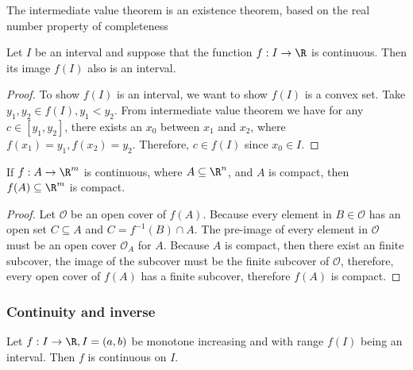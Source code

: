 \begin{refsection}
\begin{remark}[interpretation]
	The intermediate value theorem is an existence theorem, based on the real number property of completeness
\end{remark}

\begin{lemma}\label{ch:calculus:th:continuousFunctionMapIntervalToInterval}\cite[65]{fitzpatrick2006advanced}
Let $I$ be an interval and suppose that the function $f:I\to \R$ is continuous. Then its image $f(I)$ also is an interval.	
\end{lemma}
\begin{proof}
To show $f(I)$ is an interval, we want to show $f(I)$ is a convex set. Take $y_1,y_2\in f(I), y_1 < y_2$. From intermediate value theorem we have for any $c\in [y_1,y_2]$, there exists an $x_0$ between $x_1$ and $x_2$, where $f(x_1)=y_1,f(x_2)=y_2$. Therefore, $c \in f(I)$ since $x_0\in I$.
\end{proof}



\begin{lemma}
	\cite[129]{abbott2001understanding}\cite[12]{spivak} If $f:A\to \R^m$ is continuous, where $A\subseteq \R^n$, and $A$ is compact, then $f(A)\subseteq \R^m$ is compact.
\end{lemma}
\begin{proof}
	Let $\mathcal{O}$ be an open cover of $f(A)$. Because every element in $B\in \mathcal{O}$ has an open set $C \subseteq A$ and $C = f^{-1}(B)\cap A$. The pre-image of every element in $\mathcal{O}$ must be an open cover $\mathcal{O}_A$ for $A$. Because $A$ is compact, then there exist an finite subcover, the image of the subcover must be the finite subcover of $\mathcal{O}$, therefore, every open cover of $f(A)$ has a finite subcover, therefore $f(A)$ is compact.  	
\end{proof}


\subsubsection{Continuity and inverse}

\begin{lemma} \cite[76]{fitzpatrick2006advanced}\label{ch:calculus:th:continuityAndImagetopogoly}
Let $f:I\to \R, I=(a,b)$ be monotone increasing and with range $f(I)$ being an interval. Then $f$ is continuous on $I$.


\end{lemma}
\end{refsection}
